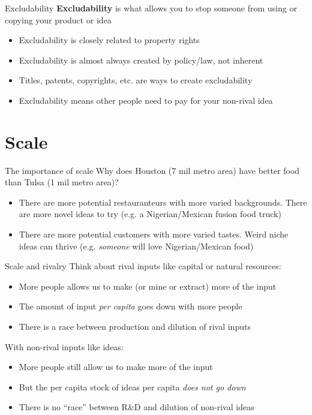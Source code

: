 \begin{frame}{Excludability}
\textbf{Excludability} is what allows you to stop someone from using or copying your product or idea
\begin{itemize}
	\item Excludability is closely related to property rights
	\item Excludability is almost always created by policy/law, not inherent
	\item Titles, patents, copyrights, etc. are ways to create excludability
	\item Excludability means other people need to pay for your non-rival idea
\end{itemize}
\end{frame}

\section{Scale}
\begin{frame}{The importance of scale}
Why does Houston (7 mil metro area) have better food than Tulsa (1 mil metro area)?
\begin{itemize}
	\item There are more potential restauranteurs with more varied backgrounds. There are more novel ideas to try (e.g. a Nigerian/Mexican fusion food truck)
	\item There are more potential customers with more varied tastes. Weird niche ideas can thrive (e.g. \textit{someone} will love Nigerian/Mexican food)
\end{itemize}
\end{frame}

\begin{frame}{Scale and rivalry}
Think about rival inputs like capital or natural resources:
\begin{itemize}
	\item More people allows us to make (or mine or extract) more of the input
	\item The amount of input \textit{per capita} goes down with more people
	\item There is a race between production and dilution of rival inputs
\end{itemize}
With non-rival inputs like ideas:
\begin{itemize}
	\item More people still allow us to make more of the input
	\item But the per capita stock of ideas per capita \textit{does not go down}
	\item There is no ``race'' between R\&D and dilution of non-rival ideas
\end{itemize}
\end{frame}

